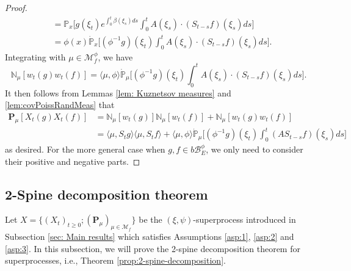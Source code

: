 \documentclass[UTF8]{pkuthss}
\theoremstyle{plain}
\theoremstyle{definition}
\numberwithin{equation}{section}
\begin{document}
\begin{proof}
\begin{equation}
\begin{split}
	&= \mathbb P_x \Big[g(\xi_t) e^{\int_0^t \beta(\xi_s) ds} \int_0^t A(\xi_s)\cdot (S_{t-s} f)(\xi_s) ds\Big]\\
	&= \phi(x) \dot{\mathbb P}_x \Big[(\phi^{-1} g)(\xi_t) \int_0^t A(\xi_s)\cdot (S_{t-s} f)(\xi_s)ds \Big].
\end{split}\end{equation}
	Integrating with $\mu \in \mathcal M_f^{\phi}$, we have
\begin{equation}
\label{eq: sec moment for N measure}
	\mathbb N_\mu[w_t(g)w_t(f)]
	= \langle\mu, \phi\rangle \dot{\mathbb P}_{\mu} \Big[(\phi^{-1} g)(\xi_t) \int_0^t A(\xi_s)\cdot (S_{t-s} f)(\xi_s) ds\Big].
\end{equation}
It then follows from Lemmas \ref{lem: Kuznetsov measures} and
	\ref{lem:covPoissRandMeas} that
\[\begin{split}
	\mathbf P_\mu[ X_t( g) X_t( f)]
	&= \mathbb N_\mu[ w_t( g)] \mathbb N_\mu[ w_t( f)] + \mathbb N_\mu[ w_t( g) w_t( f)]\\
	&= \langle \mu, S_t g\rangle \langle \mu, S_t f\rangle + \langle \mu, \phi\rangle \dot{\mathbb P}_{\mu} \Big[ ( \phi^{-1} g)( \xi_t) \int_0^t (A S_{t-s} f)( \xi_s) ds \Big]
\end{split}\]
	as desired.
	For the more general case when $g,f\in b\mathscr B^\phi_E$, we only need to consider their positive and negative parts.
\end{proof}


\subsection{2-Spine decomposition theorem}
\label{size-biased-equation}
	Let $X=\{(X_t)_{t\geq 0}; (\mathbf P_\mu)_{\mu \in \mathcal M_f}\}$ be the $(\xi,\psi)$-superprocess introduced in Subsection \ref{sec: Main results} which satisfies Assumptions \ref{asp:1}, \ref{asp:2} and \ref{asp:3}.
	In this subsection, we will prove the 2-spine decomposition theorem for  superprocesses, i.e., Theorem \ref{prop:2-spine-decomposition}.
	
\end{document}
